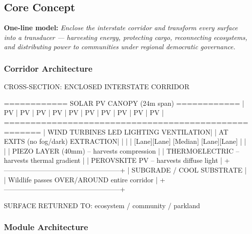 \documentclass[11pt,letterpaper]{article}
\begin{document}
\subsection{Core Concept}

\textbf{One-line model:} \textit{Enclose the interstate corridor and transform every surface into a transducer --- harvesting energy, protecting cargo, reconnecting ecosystems, and distributing power to communities under regional democratic governance.}

\subsubsection{Corridor Architecture}

\begin{asciibox}
           CROSS-SECTION: ENCLOSED INTERSTATE CORRIDOR

   ============ SOLAR PV CANOPY (24m span) ============
   | PV | PV | PV | PV | PV | PV | PV | PV | PV | PV |
   =====================================================
   |  WIND TURBINES      LED LIGHTING       VENTILATION|
   |  AT EXITS           (no fog/dark)       EXTRACTION|
   |                                                   |
   |  [Lane][Lane] [Median] [Lane][Lane]               |
   |                                                   |
   |  PIEZO LAYER (40mm) -- harvests compression       |
   |  THERMOELECTRIC      -- harvests thermal gradient |
   |  PEROVSKITE PV       -- harvests diffuse light    |
   +---------------------------------------------------+
   |       SUBGRADE / COOL SUBSTRATE                   |
   |  Wildlife passes OVER/AROUND entire corridor      |
   +---------------------------------------------------+

   SURFACE RETURNED TO: ecosystem / community / parkland
\end{asciibox}

\subsubsection{Module Architecture}
\end{document}
